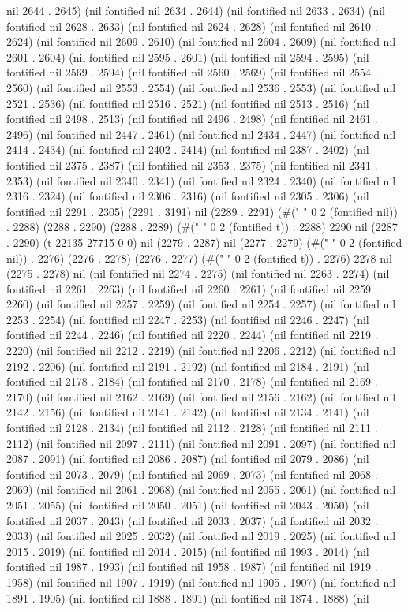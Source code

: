 nil 2644 . 2645) (nil fontified nil 2634 . 2644) (nil fontified nil 2633 . 2634) (nil fontified nil 2628 . 2633) (nil fontified nil 2624 . 2628) (nil fontified nil 2610 . 2624) (nil fontified nil 2609 . 2610) (nil fontified nil 2604 . 2609) (nil fontified nil 2601 . 2604) (nil fontified nil 2595 . 2601) (nil fontified nil 2594 . 2595) (nil fontified nil 2569 . 2594) (nil fontified nil 2560 . 2569) (nil fontified nil 2554 . 2560) (nil fontified nil 2553 . 2554) (nil fontified nil 2536 . 2553) (nil fontified nil 2521 . 2536) (nil fontified nil 2516 . 2521) (nil fontified nil 2513 . 2516) (nil fontified nil 2498 . 2513) (nil fontified nil 2496 . 2498) (nil fontified nil 2461 . 2496) (nil fontified nil 2447 . 2461) (nil fontified nil 2434 . 2447) (nil fontified nil 2414 . 2434) (nil fontified nil 2402 . 2414) (nil fontified nil 2387 . 2402) (nil fontified nil 2375 . 2387) (nil fontified nil 2353 . 2375) (nil fontified nil 2341 . 2353) (nil fontified nil 2340 . 2341) (nil fontified nil 2324 . 2340) (nil fontified nil 2316 . 2324) (nil fontified nil 2306 . 2316) (nil fontified nil 2305 . 2306) (nil fontified nil 2291 . 2305) (2291 . 3191) nil (2289 . 2291) (#("  " 0 2 (fontified nil)) . 2288) (2288 . 2290) (2288 . 2289) (#("  " 0 2 (fontified t)) . 2288) 2290 nil (2287 . 2290) (t 22135 27715 0 0) nil (2279 . 2287) nil (2277 . 2279) (#("  " 0 2 (fontified nil)) . 2276) (2276 . 2278) (2276 . 2277) (#("  " 0 2 (fontified t)) . 2276) 2278 nil (2275 . 2278) nil (nil fontified nil 2274 . 2275) (nil fontified nil 2263 . 2274) (nil fontified nil 2261 . 2263) (nil fontified nil 2260 . 2261) (nil fontified nil 2259 . 2260) (nil fontified nil 2257 . 2259) (nil fontified nil 2254 . 2257) (nil fontified nil 2253 . 2254) (nil fontified nil 2247 . 2253) (nil fontified nil 2246 . 2247) (nil fontified nil 2244 . 2246) (nil fontified nil 2220 . 2244) (nil fontified nil 2219 . 2220) (nil fontified nil 2212 . 2219) (nil fontified nil 2206 . 2212) (nil fontified nil 2192 . 2206) (nil fontified nil 2191 . 2192) (nil fontified nil 2184 . 2191) (nil fontified nil 2178 . 2184) (nil fontified nil 2170 . 2178) (nil fontified nil 2169 . 2170) (nil fontified nil 2162 . 2169) (nil fontified nil 2156 . 2162) (nil fontified nil 2142 . 2156) (nil fontified nil 2141 . 2142) (nil fontified nil 2134 . 2141) (nil fontified nil 2128 . 2134) (nil fontified nil 2112 . 2128) (nil fontified nil 2111 . 2112) (nil fontified nil 2097 . 2111) (nil fontified nil 2091 . 2097) (nil fontified nil 2087 . 2091) (nil fontified nil 2086 . 2087) (nil fontified nil 2079 . 2086) (nil fontified nil 2073 . 2079) (nil fontified nil 2069 . 2073) (nil fontified nil 2068 . 2069) (nil fontified nil 2061 . 2068) (nil fontified nil 2055 . 2061) (nil fontified nil 2051 . 2055) (nil fontified nil 2050 . 2051) (nil fontified nil 2043 . 2050) (nil fontified nil 2037 . 2043) (nil fontified nil 2033 . 2037) (nil fontified nil 2032 . 2033) (nil fontified nil 2025 . 2032) (nil fontified nil 2019 . 2025) (nil fontified nil 2015 . 2019) (nil fontified nil 2014 . 2015) (nil fontified nil 1993 . 2014) (nil fontified nil 1987 . 1993) (nil fontified nil 1958 . 1987) (nil fontified nil 1919 . 1958) (nil fontified nil 1907 . 1919) (nil fontified nil 1905 . 1907) (nil fontified nil 1891 . 1905) (nil fontified nil 1888 . 1891) (nil fontified nil 1874 . 1888) (nil 